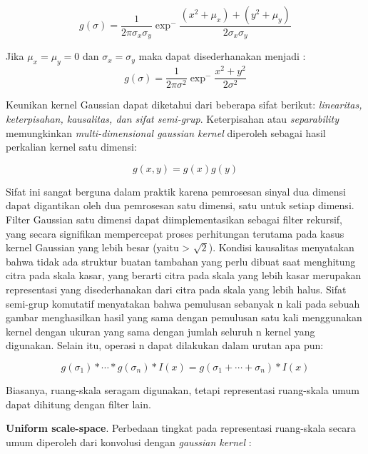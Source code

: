 \begin{equation*}
g(\sigma) = \frac{1}{2\pi\sigma_{x}\sigma_{y}}\exp^-\frac{(x^2+\mu_{x})+(y^2+\mu_{y})}{2\sigma_{x}\sigma_{y}}
\end{equation*}

Jika \(\mu_{x} = \mu_{y} = 0\) dan \(\sigma_{x} = \sigma_{y}\) maka dapat disederhanakan menjadi :
\begin{equation}
g(\sigma) = \frac{1}{2\pi\sigma^2}\exp^-\frac{x^2+y^2}{2\sigma^2}
\label{eq:gaussian kernel}
\end{equation}

Keunikan kernel Gaussian dapat diketahui dari beberapa sifat berikut: \emph{linearitas, keterpisahan, kausalitas, dan sifat semi-grup}. Keterpisahan atau \emph{separability} memungkinkan \emph{multi-dimensional gaussian kernel} diperoleh sebagai hasil perkalian kernel satu dimensi:

\begin{equation*}
  g(x,y) = g(x)g(y)
\end{equation*}

Sifat ini sangat berguna dalam praktik karena pemrosesan sinyal dua dimensi dapat digantikan oleh dua pemrosesan satu dimensi, satu untuk setiap dimensi. Filter Gaussian satu dimensi dapat diimplementasikan sebagai filter rekursif, yang secara signifikan mempercepat proses perhitungan terutama pada kasus kernel Gaussian yang lebih besar (yaitu > \( \sqrt{2}\)). Kondisi kausalitas menyatakan bahwa tidak ada struktur buatan tambahan yang perlu dibuat saat menghitung citra pada skala kasar, yang berarti citra pada skala yang lebih kasar merupakan representasi yang disederhanakan dari citra pada skala yang lebih halus. Sifat semi-grup komutatif menyatakan bahwa pemulusan sebanyak n kali pada sebuah gambar menghasilkan hasil yang sama dengan pemulusan satu kali menggunakan kernel dengan ukuran yang sama dengan jumlah seluruh n kernel yang digunakan. Selain itu, operasi n dapat dilakukan dalam urutan apa pun:

\begin{equation*}
g(\sigma_{1}) * \cdots * g(\sigma_{n}) * I(x) = g(\sigma_{1} + \cdots + \sigma_{n}) * I(x)
\end{equation*}

Biasanya, ruang-skala seragam digunakan, tetapi representasi ruang-skala umum dapat dihitung dengan filter lain.

\textbf{Uniform scale-space}. Perbedaan tingkat pada representasi ruang-skala secara umum diperoleh dari konvolusi dengan \emph{gaussian kernel} :

